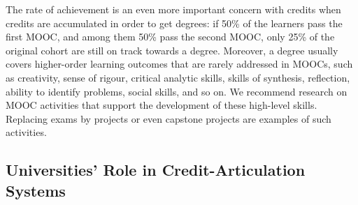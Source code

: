 The rate of achievement is an even more important concern with
credits when credits are  accumulated in order to get degrees:
if 50\% of the learners pass the first MOOC, and among them 50\%
pass the second MOOC, only 25\% of the original cohort are still on
track towards a degree. Moreover, a degree usually covers
higher-order learning outcomes that are rarely addressed in MOOCs, such
as creativity, sense of rigour, critical
analytic skills, skills of synthesis, reflection, ability to identify
problems, social skills, and so on. We
recommend research on MOOC activities that support the development of
these high-level skills. Replacing exams by projects or even capstone
projects are examples of such activities.


\subsection{Universities' Role in Credit-Articulation Systems}

